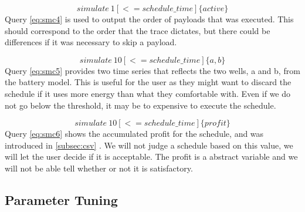 \begin{equation} \label{eq:smc4}
	simulate\ 1 [<=schedule\_time] \{ active\}
\end{equation}
Query \ref{eq:smc4} is used to output the order of payloads that was executed. This should correspond to the order that the trace dictates, but there could be differences if it was necessary to skip a payload.

\begin{equation} \label{eq:smc5}
	simulate\ 10 [<=schedule\_time] \{ a, b\}
\end{equation}
Query \ref{eq:smc5} provides two time series that reflects the two wells, a and b, from the battery model. This is useful for the user as they might want to discard the schedule if it uses more energy than what they comfortable with. Even if we do not go below the threshold, it may be to expensive to execute the schedule. %

\begin{equation} \label{eq:smc6}
	simulate\ 10 [<= schedule\_time] \{ profit \}
\end{equation}
Query \ref{eq:smc6} shows the accumulated profit for the schedule, and was introduced in \cref{subsec:csv} . We will not judge a schedule based on this value, we will let the user decide if it is acceptable. The profit is a abstract variable and we will not be able tell whether or not it is satisfactory.

\subsection{Parameter Tuning}